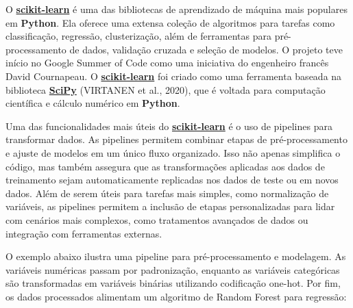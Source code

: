 \documentclass[
  12pt,
  a4paper,
]{scrreprt}
\begin{document}
\vspace{12pt}

O \href{https://scikit-learn.org/stable/}{\textbf{scikit-learn}} é uma
das bibliotecas de aprendizado de máquina mais populares em
\textbf{Python}. Ela oferece uma extensa coleção de algoritmos para
tarefas como classificação, regressão, clusterização, além de
ferramentas para pré-processamento de dados, validação cruzada e seleção
de modelos. O projeto teve início no Google Summer of Code como uma
iniciativa do engenheiro francês David Cournapeau. O
\href{https://scikit-learn.org/stable/}{\textbf{scikit-learn}} foi
criado como uma ferramenta baseada na biblioteca
\href{https://scipy.org/}{\textbf{SciPy}} (VIRTANEN et al., 2020), que é
voltada para computação científica e cálculo numérico em
\textbf{Python}.

\vspace{12pt}

Uma das funcionalidades mais úteis do
\href{https://scikit-learn.org/stable/}{\textbf{scikit-learn}} é o uso
de pipelines para transformar dados. As pipelines permitem combinar
etapas de pré-processamento e ajuste de modelos em um único fluxo
organizado. Isso não apenas simplifica o código, mas também assegura que
as transformações aplicadas aos dados de treinamento sejam
automaticamente replicadas nos dados de teste ou em novos dados. Além de
serem úteis para tarefas mais simples, como normalização de variáveis,
as pipelines permitem a inclusão de etapas personalizadas para lidar com
cenários mais complexos, como tratamentos avançados de dados ou
integração com ferramentas externas.

\vspace{12pt}

O exemplo abaixo ilustra uma pipeline para pré-processamento e
modelagem. As variáveis numéricas passam por padronização, enquanto as
variáveis categóricas são transformadas em variáveis binárias utilizando
codificação one-hot. Por fim, os dados processados alimentam um
algoritmo de Random Forest para regressão:
\end{document}
